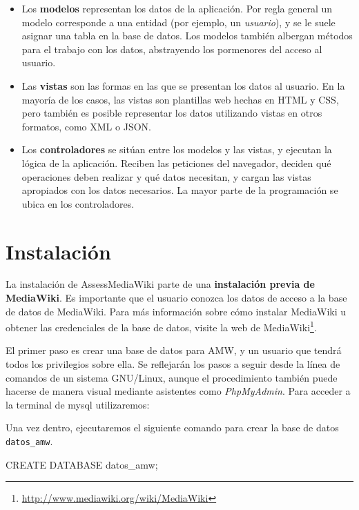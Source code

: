 \documentclass[11pt]{article}
\begin{document}
\begin{itemize}
\item Los \textbf{modelos} representan los datos de la aplicación. Por regla
  general un modelo corresponde a una entidad (por ejemplo, un
  \textit{usuario}), y se le suele asignar una tabla en la base de datos. Los
  modelos también albergan métodos para el trabajo con los datos, abstrayendo
  los pormenores del acceso al usuario.
\item Las \textbf{vistas} son las formas en las que se presentan los datos al
  usuario. En la mayoría de los casos, las vistas son plantillas web hechas en
  HTML y CSS, pero también es posible representar los datos utilizando vistas en
  otros formatos, como XML o JSON.
\item Los \textbf{controladores} se sitúan entre los modelos y las vistas, y
  ejecutan la lógica de la aplicación. Reciben las peticiones del navegador,
  deciden qué operaciones deben realizar y qué datos necesitan, y cargan las
  vistas apropiados con los datos necesarios. La mayor parte de la programación
  se ubica en los controladores.
\end{itemize}

\section{Instalación}

La instalación de AssessMediaWiki parte de una \textbf{instalación previa de
  MediaWiki}. Es importante que el usuario conozca los datos de acceso a la base
de datos de MediaWiki. Para más información sobre cómo instalar MediaWiki u
obtener las credenciales de la base de datos, visite la web de
MediaWiki\footnote{\url{http://www.mediawiki.org/wiki/MediaWiki}}.

El primer paso es crear una base de datos para AMW, y un usuario que tendrá
todos los privilegios sobre ella. Se reflejarán los pasos a seguir desde la
línea de comandos de un sistema GNU/Linux, aunque el procedimiento también puede
hacerse de manera visual mediante asistentes como \textit{PhpMyAdmin}. Para
acceder a la terminal de mysql utilizaremos:

\begin{sqlcode}
\end{sqlcode}

Una vez dentro, ejecutaremos el siguiente comando para crear la base de datos
\texttt{datos\_amw}.

\begin{sqlcode}
CREATE DATABASE datos_amw;   
\end{sqlcode}
\end{document}
